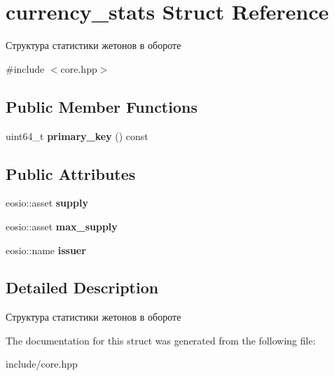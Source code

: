 \hypertarget{structcurrency__stats}{}\section{currency\+\_\+stats Struct Reference}
\label{structcurrency__stats}


Структура статистики жетонов в обороте  




{\ttfamily \#include $<$core.\+hpp$>$}

\subsection*{Public Member Functions}
\begin{DoxyCompactItemize}
\item 
\mbox{\label{structcurrency__stats_a54eba2ce368a5195026fd89ca505d28b}} 
uint64\+\_\+t {\bfseries primary\+\_\+key} () const
\end{DoxyCompactItemize}
\subsection*{Public Attributes}
\begin{DoxyCompactItemize}
\item 
\mbox{\label{structcurrency__stats_a1afb7ac2a502c69231cc27aebd720a45}} 
eosio\+::asset {\bfseries supply}
\item 
\mbox{\label{structcurrency__stats_a9da25dbd496e340784f978aa353b8679}} 
eosio\+::asset {\bfseries max\+\_\+supply}
\item 
\mbox{\label{structcurrency__stats_a9e27c17d1a33bc5a16cb502c96b1695b}} 
eosio\+::name {\bfseries issuer}
\end{DoxyCompactItemize}


\subsection{Detailed Description}
Структура статистики жетонов в обороте 

The documentation for this struct was generated from the following file\+:\begin{DoxyCompactItemize}
\item 
include/core.\+hpp\end{DoxyCompactItemize}
